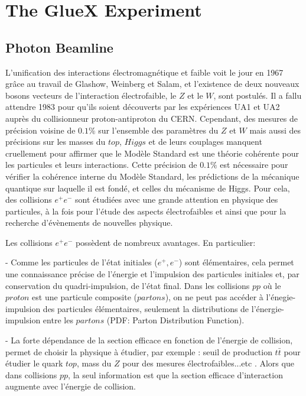 \section{The GlueX Experiment}
\label{p2}

\subsection{Photon Beamline}

L'unification des interactions \'electromagn\'etique et faible voit le jour en 1967 gr\^ace au travail de Glashow, Weinberg et Salam, et l'existence de deux nouveaux bosons vecteurs de l’interaction \'electrofaible, le $Z$ et le $W$, sont postul\'es. Il a fallu attendre 1983 pour qu'ils soient d\'ecouverts par les exp\'eriences UA1 et UA2 aupr\`es du collisionneur proton-antiproton du CERN.
Cependant, des mesures de pr\'ecision voisine de $0.1\%$ sur l'ensemble des param\`etres du $Z$ et $W$ mais aussi des pr\'ecisions sur les masses du $top$, $Higgs$ et de leurs couplages manquent cruellement pour affirmer que le Mod\`ele Standard est une th\'eorie coh\'erente pour les particules et leurs interactions. Cette pr\'ecision de $0.1\%$ est n\'ecessaire pour v\'erifier la coh\'erence interne du Mod\`ele Standard, les pr\'edictions de la m\'ecanique quantique sur laquelle il est fond\'e, et celles du m\'ecanisme de Higgs. Pour cela, des collisions $e^{+}e^{-}$ sont \'etudi\'ees avec une grande attention en physique des particules, à la fois pour l'\'etude des aspects \'electrofaibles et ainsi que pour la recherche d'\'ev\`enements de nouvelles physique.
~\par Les collisions $e^{+}e^{-}$ poss\`edent de nombreux avantages. En particulier: 
~\par- Comme les particules de l'\'etat initiales ($e^{+}, e^{-}$) sont \'el\'ementaires, cela permet une connaissance pr\'ecise de l'\'energie et l'impulsion des particules initiales et, par conservation du quadri-impulsion, de l'\'etat final. Dans les collisions $pp$ o\`u le $proton$ est une particule composite ($partons$), on ne peut pas acc\'eder \`a l'\'enegie-impulsion des particules \'el\'ementaires, seulement la distributions de l'\'energie-impulsion entre les $partons$ (PDF: Parton Distribution Function).
~\par- La forte dépendance de la section efficace en fonction de l'\'energie de collision, permet de choisir la physique \`a \'etudier, par exemple : seuil de production $t\bar{t}$ pour étudier le quark $top$, mass du $Z$ pour des mesures électrofaibles...etc . Alors que dans collisions $pp$, la seul information est que la section efficace d'interaction augmente avec l'\'energie de collision.
